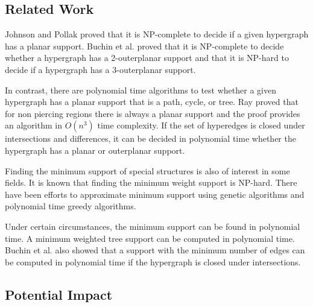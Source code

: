 \documentclass{NSF}
\begin{document}
\subsection{Related Work}

Johnson and Pollak proved that it is NP-complete to decide if a given hypergraph has a planar support.
Buchin et al. proved that it is NP-complete to decide whether a hypergraph has a 2-outerplanar support and that it is NP-hard to decide if a hypergraph has a 3-outerplanar support. \cite{buchin2010}

In contrast, there are polynomial time algorithms to test whether a given hypergraph has a planar support that is a path, cycle, or tree. \cite{johnson1987}
Ray proved that for non piercing regions there is always a planar support and the proof provides an algorithm in $O(n^3)$ time complexity. \cite{Pyrga2008}
If the set of hyperedges is closed under intersections and differences, it can be decided in polynomial time whether the hypergraph has a planar or outerplanar support. \cite{brandes2011}

Finding the minimum support of special structures is also of interest in some fields.
It is known that finding the minimum weight support is NP-hard. \cite{Du1998}
There have been efforts to approximate minimum support using genetic algorithms \cite{abuali1996} and polynomial time greedy algorithms. \cite{Du1998}

Under certain circumstances, the minimum support can be found in polynomial time.
A minimum weighted tree support can be computed in polynomial time. \cite{Korach2003} Buchin et al. also showed that a support with the minimum number of edges can be computed in polynomial time if the hypergraph is closed under intersections. \cite{buchin2010}


\subsection{Potential Impact}
\end{document}
